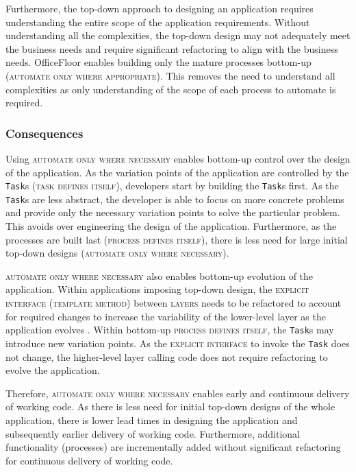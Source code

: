\documentclass[prodmode]{style/acmlarge}
\begin{document}
Furthermore, the top-down approach to designing an application requires
understanding the entire scope of the application requirements.  Without
understanding all the complexities, the top-down design may not adequately meet
the business needs and require significant refactoring to align with the
business needs.  OfficeFloor enables building only the mature processes
bottom-up (\textsc{automate only where appropriate}).  This removes the need to
understand all complexities as only understanding of the scope of each process
to automate is required.


\subsubsection*{Consequences}

Using \textsc{automate only where necessary} enables bottom-up control over the
design of the application.  As the variation points of the application are
controlled by the \texttt{Task}s (\textsc{task defines itself}), developers
start by building the \texttt{Task}s first.  As the \texttt{Task}s are less
abstract, the developer is able to focus on more concrete problems and provide
only the necessary variation points to solve the particular problem.  This
avoids over engineering the design of the application.  Furthermore, as the
processes are built last (\textsc{process defines itself}), there is less need
for large initial top-down designs (\textsc{automate only where necessary}).

\textsc{automate only where necessary} also enables bottom-up evolution of the
application.  Within applications imposing top-down design, the
\textsc{explicit interface} (\textsc{template method}) between \textsc{layers}
needs to be refactored to account for required changes to increase the
variability of the lower-level layer as the application evolves \cite{ioc}.
Within bottom-up \textsc{process defines itself}, the \texttt{Task}s may
introduce new variation points.  As the \textsc{explicit interface} to invoke
the \texttt{Task} does not change, the higher-level layer calling code does not
require refactoring to evolve the application.

Therefore, \textsc{automate only where necessary} enables early and continuous
delivery of working code.  As there is less need for initial top-down designs of
the whole application, there is lower lead times in designing the application
and subsequently earlier delivery of working code.  Furthermore, additional
functionality (processes) are incrementally added without significant
refactoring for continuous delivery of working code.
\end{document}
